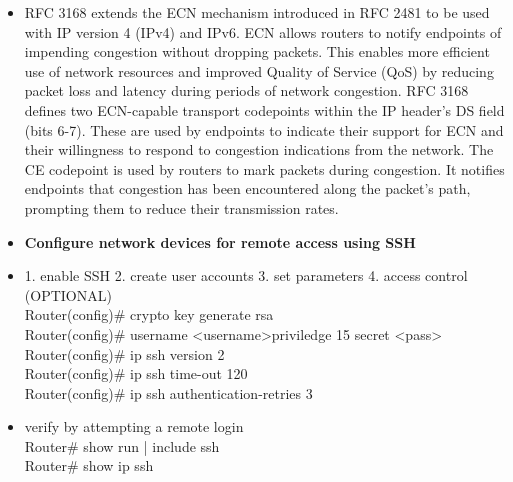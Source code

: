 \documentclass{article}
\begin{document}
\begin{itemize}
	\item[] RFC 3168 extends the ECN mechanism introduced in RFC 2481 to be used with IP version 4 (IPv4) and IPv6. ECN allows routers to notify endpoints of impending congestion without dropping packets. This enables more efficient use of network resources and improved Quality of Service (QoS) by reducing packet loss and latency during periods of network congestion. RFC 3168 defines two ECN-capable transport codepoints within the IP header's DS field (bits 6-7). These are used by endpoints to indicate their support for ECN and their willingness to respond to congestion indications from the network. The CE codepoint is used by routers to mark packets during congestion. It notifies endpoints that congestion has been encountered along the packet's path, prompting them to reduce their transmission rates.
  
  \item \textbf{Configure network devices for remote access using SSH}
  	\item[] 1. enable SSH 2. create user accounts 3. set parameters 4. access control (OPTIONAL)\\
		Router(config)\# crypto key generate rsa\\
		Router(config)\# username \textless username\textgreater priviledge 15 secret \textless pass\textgreater\\
		Router(config)\# ip ssh version 2\\
		Router(config)\# ip ssh time-out 120\\
		Router(config)\# ip ssh authentication-retries 3
	\item[] verify by attempting a remote login\\
		Router\# show run | include ssh\\
		Router\# show ip ssh
  

\end{itemize}
\end{document}
